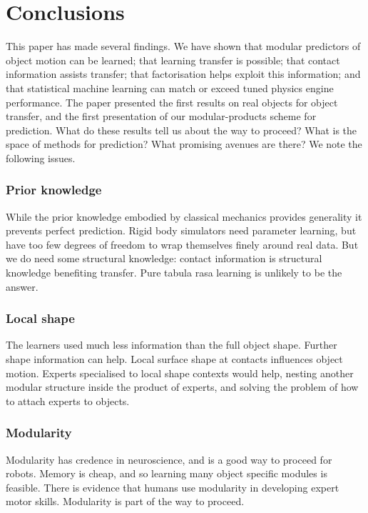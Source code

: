 
\section{Conclusions}\label{sec:Discussion}

This paper has made several findings. We have shown that modular predictors of object motion can be learned; that learning transfer is possible; that contact information assists transfer; that factorisation helps exploit this information; and that statistical machine learning can match or exceed tuned physics engine performance. The paper presented the first results on real objects for object transfer, and the first presentation of our modular-products scheme for prediction. What do these results tell us about the way to proceed? What is the space of methods for prediction? What promising avenues are there? We note the following issues.

\subsubsection{ Prior knowledge} While the prior knowledge embodied by classical mechanics provides generality it prevents perfect prediction. Rigid body simulators need parameter learning, but have too few degrees of freedom to wrap themselves finely around real data. But we do need some structural knowledge: contact information is structural knowledge benefiting transfer. Pure tabula rasa learning is unlikely to be the answer. 

\subsubsection{ Local shape} The learners used much less information than the full object shape. Further shape information can help. Local surface shape at contacts influences object motion. Experts specialised to local shape contexts would help, nesting another modular structure inside the product of experts, and solving the problem of how to attach experts to objects.

\subsubsection{ Modularity} Modularity has credence in neuroscience, and is a good way to proceed for robots. Memory is cheap, and so learning many object specific modules is feasible. There is evidence that humans use modularity in developing expert motor skills. Modularity is part of the way to proceed.


